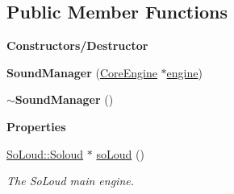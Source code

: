 \subsection*{Public Member Functions}
\begin{Indent}\textbf{ Constructors/\+Destructor}\par
\begin{DoxyCompactItemize}
\item 
\mbox{\label{classrev_1_1_sound_manager_ab023a7891c2b5834320f82e3cd23ceaa}} 
{\bfseries Sound\+Manager} (\mbox{\hyperlink{classrev_1_1_core_engine}{Core\+Engine}} $\ast$\mbox{\hyperlink{classrev_1_1_manager_a0fbd0df6b4f3caf42b557f9702f48171}{engine}})
\item 
\mbox{\label{classrev_1_1_sound_manager_acc5934f158ca36921465ac54f90f7f7a}} 
{\bfseries $\sim$\+Sound\+Manager} ()
\end{DoxyCompactItemize}
\end{Indent}
\begin{Indent}\textbf{ Properties}\par
\begin{DoxyCompactItemize}
\item 
\mbox{\label{classrev_1_1_sound_manager_aed2e05f20c63268f5113283f12154a29}} 
\mbox{\hyperlink{class_so_loud_1_1_soloud}{So\+Loud\+::\+Soloud}} $\ast$ \mbox{\hyperlink{classrev_1_1_sound_manager_aed2e05f20c63268f5113283f12154a29}{so\+Loud}} ()
\begin{DoxyCompactList}\small\item\em The So\+Loud main engine. \end{DoxyCompactList}\end{DoxyCompactItemize}
\end{Indent}
